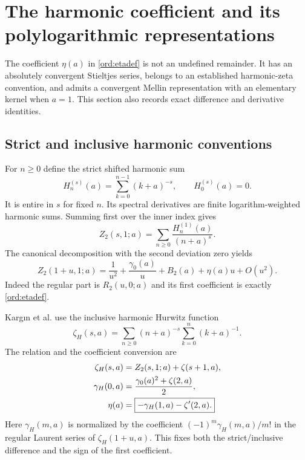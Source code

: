 \section{The harmonic coefficient and its polylogarithmic representations}
\label{sec:harmonic}

The coefficient $\eta(a)$ in \eqref{ord:etadef} is not an undefined
remainder. It has an absolutely convergent Stieltjes series, belongs
to an established harmonic-zeta convention, and admits a convergent
Mellin representation with an elementary kernel when $a=1$.
This section also records exact difference and derivative identities.

\subsection{Strict and inclusive harmonic conventions}

For $n\ge0$ define the strict shifted harmonic sum
\[
 H_n^{(s)}(a)=\sum_{k=0}^{n-1}(k+a)^{-s},\qquad H_0^{(s)}(a)=0.
\]
It is entire in $s$ for fixed $n$. Its spectral derivatives are
finite logarithm-weighted harmonic sums. Summing first over the
inner index gives
\begin{equation}\label{harm:strict}
 Z_2(s,1;a)=\sum_{n\ge0}\frac{H_n^{(1)}(a)}{(n+a)^s}.
\end{equation}
The canonical decomposition with the second deviation zero yields
\begin{equation}\label{harm:etaLaurent}
 Z_2(1+u,1;a)=\frac1{u^2}+\frac{\gamma_0(a)}u+
 B_2(a)+\eta(a)u+O(u^2).
\end{equation}
Indeed the regular part is $R_2(u,0;a)$ and its first coefficient is
exactly \eqref{ord:etadef}.

Karg\i n et al. use the inclusive harmonic Hurwitz function
\cite{Kargin}
\[
 \zeta_H(s,a)=\sum_{n\ge0}(n+a)^{-s}
                           \sum_{k=0}^{n}(k+a)^{-1}.
\]
The relation and the coefficient conversion are
\begin{align}
 \zeta_H(s,a)&=Z_2(s,1;a)+\zeta(s+1,a),\label{harm:inclusive}\\
 \gamma_H(0,a)&=\frac{\gamma_0(a)^2+\zeta(2,a)}2,\notag\\
 \eta(a)&=\boxed{-\gamma_H(1,a)-\zeta'(2,a).}\label{harm:conversion}
\end{align}
Here $\gamma_H(m,a)$ is normalized by the coefficient
$(-1)^m\gamma_H(m,a)/m!$ in the regular Laurent series of
$\zeta_H(1+u,a)$. This fixes both the strict/inclusive difference and
the sign of the first coefficient.

